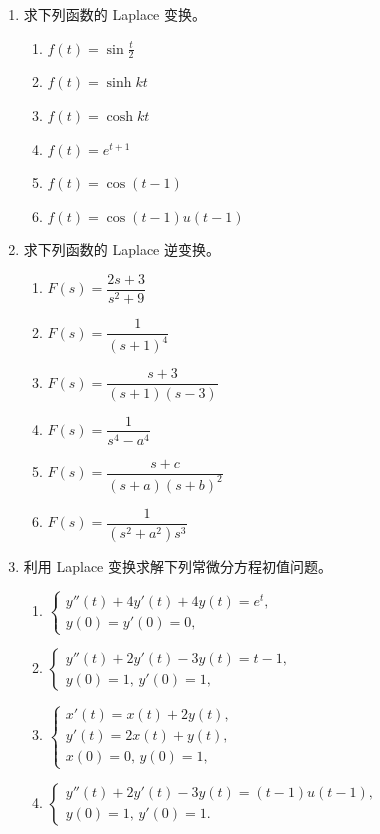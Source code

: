\documentclass[openany,oneside]{ctexbook}
\begin{document}
\begin{enumerate}[label=\arabic*., start=1]
\item 求下列函数的 Laplace 变换。
\begin{enumerate}[label=(\arabic*)]
\item \(f(t) = \sin \frac{t}{2}\)
\item \(f(t) = \sinh kt\)
\item \(f(t) = \cosh kt\)
\item \(f(t) = e^{t+1}\)
\item \(f(t) = \cos(t-1)\)
\item \(f(t) = \cos(t-1)u(t-1)\)
\end{enumerate}

\item 求下列函数的 Laplace 逆变换。
\begin{enumerate}[label=(\arabic*)]
\item \(F(s) = \dfrac{2s + 3}{s^2 + 9}\)
\item \(F(s) = \dfrac{1}{(s+1)^4}\)
\item \(F(s) = \dfrac{s+3}{(s+1)(s-3)}\)
\item \(F(s) = \dfrac{1}{s^4 - a^4}\)
\item \(F(s) = \dfrac{s+c}{(s+a)(s+b)^2}\)
\item \(F(s) = \dfrac{1}{(s^2 + a^2)s^3}\)
\end{enumerate}

\item 利用 Laplace 变换求解下列常微分方程初值问题。
\begin{enumerate}[label=(\arabic*)]
\item \(\begin{cases} 
y''(t) + 4y'(t) + 4y(t) = e^t, \\ 
y(0) = y'(0) = 0,
\end{cases}\)
\item \(\begin{cases} 
y''(t) + 2y'(t) - 3y(t) = t - 1, \\ 
y(0) = 1, \, y'(0) = 1,
\end{cases}\)
\item \(\begin{cases} 
x'(t) = x(t) + 2y(t), \\ 
y'(t) = 2x(t) + y(t), \\ 
x(0) = 0, \, y(0) = 1,
\end{cases}\)
\item \(\begin{cases} 
y''(t) + 2y'(t) - 3y(t) = (t-1)u(t-1), \\ 
y(0) = 1, \, y'(0) = 1.
\end{cases}\)
\end{enumerate}
\end{enumerate}
\end{document}
